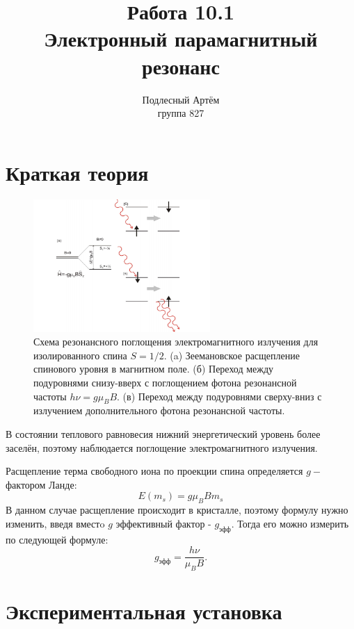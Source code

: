 \documentclass[a4paper, 14pt]{extarticle}%
\author{Подлесный Артём \\ группа 827}
\title{Работа 10.1 \\ Электронный парамагнитный резонанс}
\newcommand\ECaption[1]{%
     \captionsetup{font=footnotesize}%
     \caption{#1}}
\begin{document}
\maketitle

\section*{Краткая теория}

\begin{figure}[h]
\begin{center}
\includegraphics[width=0.6\textwidth]{teor}
\end{center}
\ECaption{Схема резонансного поглощения электромагнитного излучения для изолированного
спина $S=1/2$. (a) Зеемановское расщепление спинового уровня в магнитном поле. (б) Переход
между подуровнями снизу-вверх с поглощением фотона резонансной частоты
$h \nu=g \mu_B B $. (в) Переход между подуровнями сверху-вниз с излучением дополнительного
фотона резонансной частоты.}
\end{figure}
В состоянии теплового
равновесия нижний энергетический уровень более заселён, поэтому наблюдается
поглощение электромагнитного излучения. 

Расщепление терма свободного иона по проекции спина определяется $g-$фактором Ланде:
\begin{equation}
E(m_s) = g \mu_B B m_s
\end{equation}
В данном случае расщепление происходит в кристалле, поэтому формулу нужно изменить, введя вместo $g$ эффективный фактор - $g_{\text{эфф}}$. Тогда его можно измерить по следующей формуле:
\begin{equation}
g_{\text{эфф}} = \frac{h\nu}{\mu_B B}.
\end{equation}

\section*{Экспериментальная установка}
\end{document}
